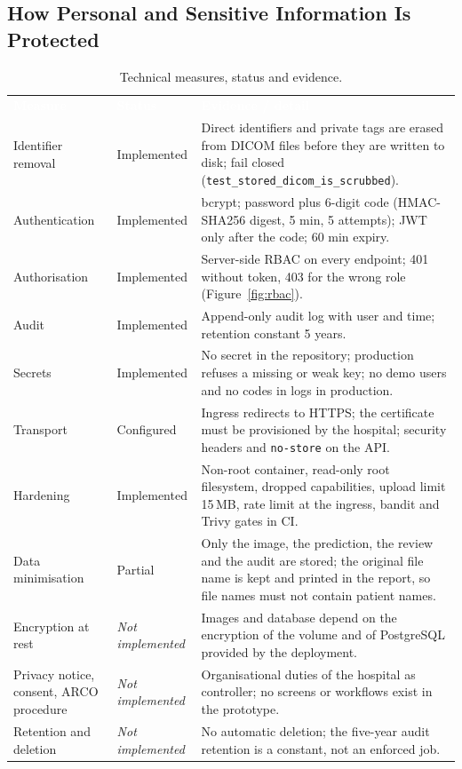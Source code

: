 \documentclass[12pt,a4paper]{article}
\newcommand{\hd}[1]{\textcolor{white}{\textbf{#1}}}
\begin{document}
\subsection{How Personal and Sensitive Information Is Protected}

\begin{table}[H]
\centering
\caption{Technical measures, status and evidence.}
\label{tab:privacy}
\renewcommand{\arraystretch}{1.25}
\begin{tabularx}{\textwidth}{L{3.7cm} L{2.4cm} Y}
\hd{Measure} & \hd{Status} & \hd{Evidence / detail} \\
Identifier removal & Implemented & Direct identifiers and private tags are erased from DICOM files before they are written to disk; fail closed (\texttt{test\_stored\_dicom\_is\_scrubbed}). \\
Authentication & Implemented & bcrypt; password plus 6-digit code (HMAC-SHA256 digest, 5 min, 5 attempts); JWT only after the code; 60 min expiry. \\
Authorisation & Implemented & Server-side RBAC on every endpoint; 401 without token, 403 for the wrong role (Figure~\ref{fig:rbac}). \\
Audit & Implemented & Append-only audit log with user and time; retention constant 5 years. \\
Secrets & Implemented & No secret in the repository; production refuses a missing or weak key; no demo users and no codes in logs in production. \\
Transport & Configured & Ingress redirects to HTTPS; the certificate must be provisioned by the hospital; security headers and \texttt{no-store} on the API. \\
Hardening & Implemented & Non-root container, read-only root filesystem, dropped capabilities, upload limit 15\,MB, rate limit at the ingress, bandit and Trivy gates in CI. \\
Data minimisation & Partial & Only the image, the prediction, the review and the audit are stored; the original file name is kept and printed in the report, so file names must not contain patient names. \\
Encryption at rest & \emph{Not implemented} & Images and database depend on the encryption of the volume and of PostgreSQL provided by the deployment. \\
Privacy notice, consent, ARCO procedure & \emph{Not implemented} & Organisational duties of the hospital as controller; no screens or workflows exist in the prototype. \\
Retention and deletion & \emph{Not implemented} & No automatic deletion; the five-year audit retention is a constant, not an enforced job. \\
\end{tabularx}
\end{table}
\end{document}
